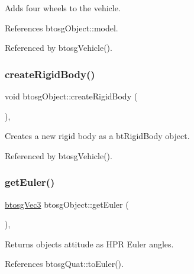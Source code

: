 Adds four wheels to the vehicle. 

References btosg\+Object\+::model.



Referenced by btosg\+Vehicle().

\mbox{\label{classbtosgObject_a029dbe9134fa94e7355799f67fb2cd6d}} 
\subsubsection{\texorpdfstring{create\+Rigid\+Body()}{createRigidBody()}}
{\footnotesize\ttfamily void btosg\+Object\+::create\+Rigid\+Body (\begin{DoxyParamCaption}{ }\end{DoxyParamCaption})\hspace{0.3cm}{\ttfamily [inline]}, {\ttfamily [inherited]}}

Creates a new rigid body as a bt\+Rigid\+Body object. 

Referenced by btosg\+Vehicle().

\mbox{\label{classbtosgObject_a2019ec63bde02b72600450c7c985e77a}} 
\subsubsection{\texorpdfstring{get\+Euler()}{getEuler()}}
{\footnotesize\ttfamily \hyperlink{classbtosgVec3}{btosg\+Vec3} btosg\+Object\+::get\+Euler (\begin{DoxyParamCaption}{ }\end{DoxyParamCaption})\hspace{0.3cm}{\ttfamily [inline]}, {\ttfamily [inherited]}}

Returns object\textquotesingle{}s attitude as H\+PR Euler angles. 

References btosg\+Quat\+::to\+Euler().

\mbox{\label{classbtosgObject_a3dadd5da8f2a312e44a039446b93d4cd}} 
